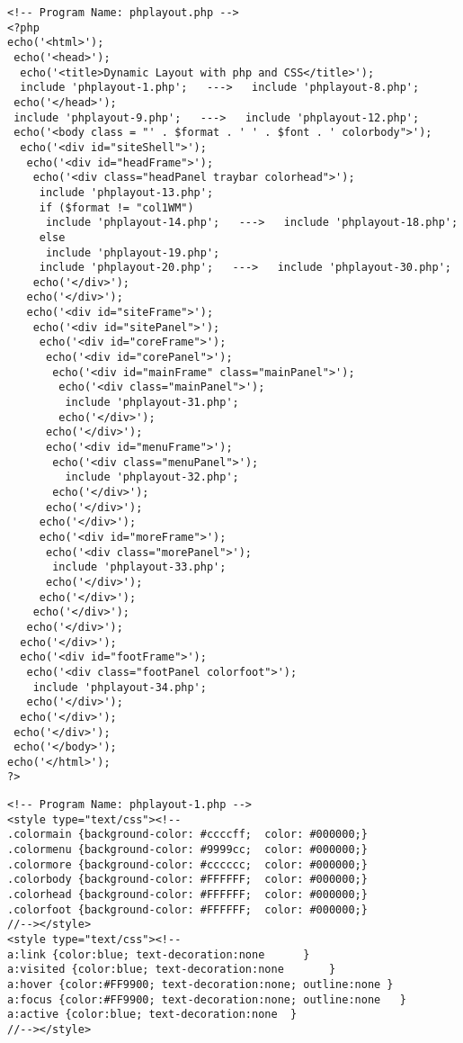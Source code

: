 \documentclass[12pt,a4paper,twosides,ngerman]{scrbook}
\begin{document}
 
\begin{center}
\begin{minipage}[t]{155mm}
\begin{lstlisting}[captionpos=b, caption=Layout - phplayout.php]
<!-- Program Name: phplayout.php -->
<?php
echo('<html>');
 echo('<head>');
  echo('<title>Dynamic Layout with php and CSS</title>');
  include 'phplayout-1.php';   --->   include 'phplayout-8.php';   
 echo('</head>');
 include 'phplayout-9.php';   --->   include 'phplayout-12.php'; 
 echo('<body class = "' . $format . ' ' . $font . ' colorbody">');
  echo('<div id="siteShell">');
   echo('<div id="headFrame">');
    echo('<div class="headPanel traybar colorhead">');
     include 'phplayout-13.php';
     if ($format != "col1WM")
      include 'phplayout-14.php';   --->   include 'phplayout-18.php';
     else
      include 'phplayout-19.php';
     include 'phplayout-20.php';   --->   include 'phplayout-30.php';
    echo('</div>');
   echo('</div>');
   echo('<div id="siteFrame">');
    echo('<div id="sitePanel">');
     echo('<div id="coreFrame">');
      echo('<div id="corePanel">');
       echo('<div id="mainFrame" class="mainPanel">');
        echo('<div class="mainPanel">');
         include 'phplayout-31.php';
        echo('</div>');
      echo('</div>');
      echo('<div id="menuFrame">');
       echo('<div class="menuPanel">');
         include 'phplayout-32.php';
       echo('</div>');
      echo('</div>');
     echo('</div>');
     echo('<div id="moreFrame">');
      echo('<div class="morePanel">');
       include 'phplayout-33.php';
      echo('</div>');
     echo('</div>');
    echo('</div>');
   echo('</div>');
  echo('</div>');
  echo('<div id="footFrame">');
   echo('<div class="footPanel colorfoot">');
    include 'phplayout-34.php';
   echo('</div>');
  echo('</div>');
 echo('</div>');
 echo('</body>');
echo('</html>');
?>
\end{lstlisting}
\end{minipage}
\end{center} 

\begin{center}
\begin{minipage}[t]{155mm}
\begin{lstlisting}[captionpos=b, caption=Layout - phplayout-1.php]
<!-- Program Name: phplayout-1.php -->
<style type="text/css"><!--
.colormain {background-color: #ccccff;  color: #000000;}
.colormenu {background-color: #9999cc;  color: #000000;}
.colormore {background-color: #cccccc;  color: #000000;}
.colorbody {background-color: #FFFFFF;  color: #000000;}
.colorhead {background-color: #FFFFFF;  color: #000000;}
.colorfoot {background-color: #FFFFFF;  color: #000000;}
//--></style>
<style type="text/css"><!--
a:link {color:blue; text-decoration:none      }
a:visited {color:blue; text-decoration:none       }
a:hover {color:#FF9900; text-decoration:none; outline:none }
a:focus {color:#FF9900; text-decoration:none; outline:none   }
a:active {color:blue; text-decoration:none  }
//--></style>
\end{lstlisting}
\end{minipage}
\end{center} 
 
\end{document}
